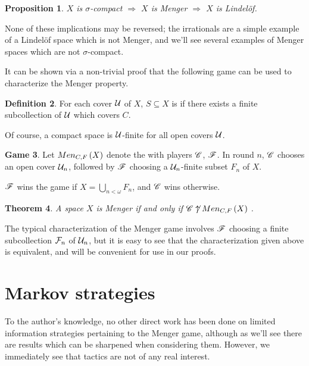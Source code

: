 \documentclass{amsart}
\newtheorem{theorem}{Theorem}[section]
\newtheorem{proposition}[theorem]{Proposition}
\theoremstyle{definition}
\newtheorem{definition}[theorem]{Definition}
\newtheorem{game}[theorem]{Game}
\begin{document}
\begin{proposition}
  \(X\) is \(\sigma\)-compact
    \(\Rightarrow\)
  \(X\) is Menger
    \(\Rightarrow\)
  \(X\) is Lindel\"of.
\end{proposition}

None of these implications may be reversed; the irrationals are a simple example
of a Lindel\"of space which is not Menger, and we'll see several examples of
Menger spaces which are not \(\sigma\)-compact.

It can be shown via a non-trivial
proof that the following game can be used to characterize the Menger property.

\begin{definition}
  For each cover \(\mathcal{U}\) of \(X\), \(S\subseteq X\) is  if
  there exists a finite subcollection of \(\mathcal{U}\) which covers \(C\).
\end{definition}

Of course, a compact space is \(\mathcal{U}\)-finite for all open covers \(\mathcal{U}\).

\begin{game}
  Let \(Men_{C,F}\left({X}\right)\) denote the  with players \(\mathscr{C}\), \(\mathscr{F}\).
  In round \(n\), \(\mathscr{C}\) chooses an open cover \(\mathcal{U}_n\), followed by \(\mathscr{F}\)
  choosing a \(\mathcal{U}_n\)-finite subset \(F_n\) of \(X\).

  \(\mathscr{F}\) wins the game if \(X = \bigcup_{n<\omega}F_n\),
  and \(\mathscr{C}\) wins otherwise.
\end{game}

\begin{theorem}
  A space \(X\) is Menger if and only if \(\mathscr{C}\not\uparrow Men_{C,F}\left({X}\right)\)
  \cite{MR1544773}.
\end{theorem}

The typical characterization of the Menger game involves \(\mathscr{F}\) choosing
a finite subcollection \(\mathcal{F}_n\) of \(\mathcal{U}_n\), but it is easy to see that the
characterization given above is equivalent, and will be convenient for use
in our proofs.


\section{Markov strategies}

To the author's knowledge, no other direct work has been done on limited
information strategies pertaining to the Menger game, although as we'll see
there are results which can be sharpened when considering them.
However, we immediately see that tactics are not of any real interest.
\end{document}

